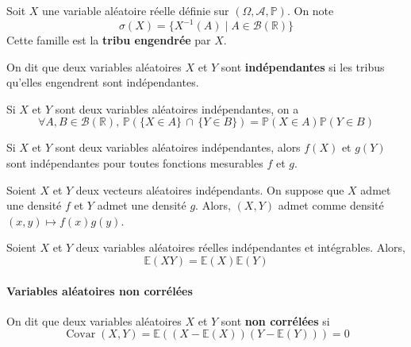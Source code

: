 
  \begin{definition}
    Soit $X$ une variable aléatoire réelle définie sur $(\Omega, \mathcal{A}, \mathbb{P})$. On note
    \[ \sigma(X) = \{ X^{-1}(A) \mid A \in \mathcal{B}(\mathbb{R}) \} \]
    Cette famille est la \textbf{tribu engendrée} par $X$.
  \end{definition}

  \begin{definition}
    On dit que deux variables aléatoires $X$ et $Y$ sont \textbf{indépendantes} si les tribus qu'elles engendrent sont indépendantes.
  \end{definition}

  \begin{example}
    Si $X$ et $Y$ sont deux variables aléatoires indépendantes, on a
    \[ \forall A, B \in \mathcal{B}(\mathbb{R}), \, \mathbb{P}(\{ X \in A \} \, \cap \, \{ Y \in B \}) = \mathbb{P}(X \in A) \mathbb{P}(Y \in B) \]
  \end{example}

  \begin{proposition}
    Si $X$ et $Y$ sont deux variables aléatoires indépendantes, alors $f(X)$ et $g(Y)$ sont indépendantes pour toutes fonctions mesurables $f$ et $g$.
  \end{proposition}


  \begin{proposition}
    Soient $X$ et $Y$ deux vecteurs aléatoires indépendants. On suppose que $X$ admet une densité $f$ et $Y$ admet une densité $g$. Alors, $(X,Y)$ admet comme densité $(x,y) \mapsto f(x)g(y)$.
  \end{proposition}


  \begin{proposition}
    Soient $X$ et $Y$ deux variables aléatoires réelles indépendantes et intégrables. Alors,
    \[ \mathbb{E}(XY) = \mathbb{E}(X) \mathbb{E}(Y) \]
  \end{proposition}

  \paragraph{Variables aléatoires non corrélées}


  \begin{definition}
    On dit que deux variables aléatoires $X$ et $Y$ sont \textbf{non corrélées} si
    \[ \operatorname{Covar}(X,Y) = \mathbb{E}\left((X - \mathbb{E}(X))(Y - \mathbb{E}(Y))\right) = 0 \]
  \end{definition}

